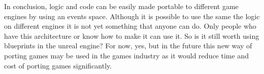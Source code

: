 \documentclass{scrartcl}
\begin{document}
In conclusion, logic and code can be easily made portable to different game engines by using an events space. Although it is possible to use the same the logic on different engines it is not yet something that anyone can do. Only people who have this architecture or know how to make it can use it. So is it still worth using blueprints in the unreal engine? For now, yes, but in the future this new way of porting games may be used in the games industry as it would reduce time and cost of porting games significantly.






\end{document}
